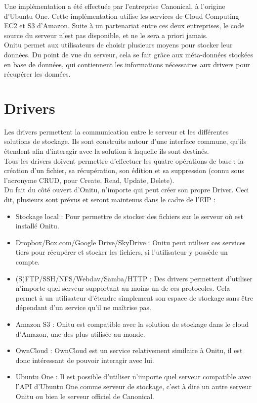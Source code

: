 Une implémentation a été effectuée par l'entreprise Canonical, à l'origine d'Ubuntu One. Cette implémentation utilise les services de Cloud Computing EC2 et S3 d'Amazon. Suite à un partenariat entre ces deux entreprises, le code source du serveur n'est pas disponible, et ne le sera a priori jamais.\\

Onitu permet aux utilisateurs de choisir plusieurs moyens pour stocker leur données. Du point de vue du serveur, cela se fait grâce aux méta-données stockées en base de données, qui contiennent les informations nécessaires aux drivers pour récupérer les données.\\

\section{Drivers}
Les drivers permettent la communication entre le serveur et les différentes solutions de stockage. Ils sont construits autour d'une interface commune, qu'ils étendent afin d'interagir avec la solution à laquelle ils sont destinés.\\

Tous les drivers doivent permettre d'effectuer les quatre opérations de base : la création d'un fichier, sa récupération, son édition et sa suppression (connu sous l'acronyme CRUD, pour Create, Read, Update, Delete).\\

Du fait du côté ouvert d'Onitu, n'importe qui peut créer son propre Driver. Ceci dit, plusieurs sont prévus et seront maintenus dans le cadre de l'EIP :
\begin{itemize}
\renewcommand{\labelitemi}{$\bullet$}
    \item Stockage local : Pour permettre de stocker des fichiers sur le serveur où est installé Onitu.
    \item Dropbox/Box.com/Google Drive/SkyDrive : Onitu peut utiliser ces services tiers pour récupérer et stocker les fichiers, si l'utilisateur y possède un compte.
    \item (S)FTP/SSH/NFS/Webdav/Samba/HTTP : Des drivers permettent d'utiliser n'importe quel serveur supportant au moins un de ces protocoles. Cela permet à un utilisateur d'étendre simplement son espace de stockage sans être dépendant d'un service qu'il ne maîtrise pas.
    \item Amazon S3 : Onitu est compatible avec la solution de stockage dans le cloud d'Amazon, une des plus utilisée au monde.
    \item OwnCloud : OwnCloud est un service relativement similaire à Onitu, il est donc intéressant de pouvoir interagir avec lui.
    \item Ubuntu One : Il est possible d'utiliser n'importe quel serveur compatible avec l'API d'Ubuntu One comme serveur de stockage, c'est à dire un autre serveur Onitu ou bien le serveur officiel de Canonical.
\end{itemize}

